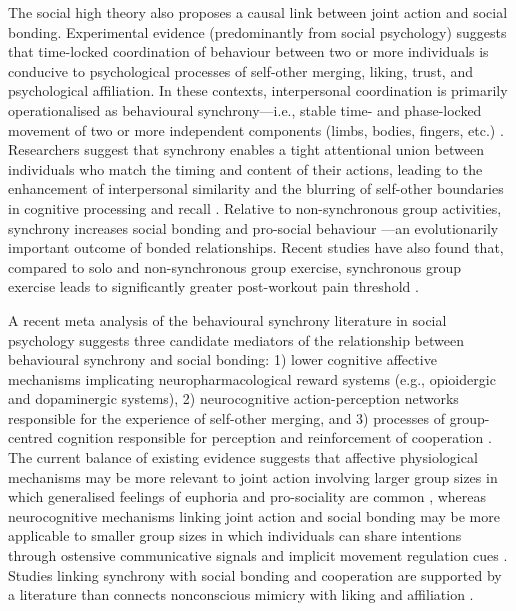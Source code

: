 \begin{CJK}{UTF8}{gbsn}
The social high theory also proposes a causal link between joint action and social bonding.  Experimental evidence (predominantly from social psychology) suggests that time-locked coordination of behaviour between two or more individuals is conducive to psychological processes of self-other merging, liking, trust, and psychological affiliation.  In these contexts, interpersonal coordination is primarily operationalised as behavioural synchrony---i.e., stable time- and phase-locked movement of two or more independent components (limbs, bodies, fingers, etc.) \citep{Pikovsky2007}. Researchers suggest that synchrony enables a tight attentional union between individuals who match the timing and content of their actions, leading to the enhancement of interpersonal similarity and the blurring of self-other boundaries in cognitive processing and recall \citep{Cohen2017}.  Relative to non-synchronous group activities, synchrony increases social bonding and pro-social behaviour \citep{Reddish2013,Reddish2013a,Wiltermuth2009,Tarr2014}---an evolutionarily important outcome of bonded relationships.  Recent studies have also found that, compared to solo and non-synchronous group exercise, synchronous group exercise leads to significantly greater post-workout pain threshold \citep{Cohen2009,Sullivan2014,Sullivan2013a, Sullivan2013b}.

A recent meta analysis of the behavioural synchrony literature in social psychology suggests three candidate mediators of the relationship between behavioural synchrony and social bonding: 1) lower cognitive affective mechanisms implicating neuropharmacological reward systems (e.g., opioidergic and dopaminergic systems), 2) neurocognitive action-perception networks responsible for the experience of self-other merging, and 3) processes of group-centred cognition responsible for perception and reinforcement of cooperation \citep{Mogan2017}.  The current balance of existing evidence suggests that affective physiological mechanisms may be more relevant to joint action involving larger group sizes in which generalised feelings of euphoria and pro-sociality are common \citep[e.g., mass religious rituals or music festivals, see][]{Weinstein2016}, whereas neurocognitive mechanisms linking joint action and social bonding may be more applicable to smaller group sizes in which individuals can share intentions through ostensive communicative signals and implicit movement regulation cues \citep{Lang2017}.  Studies linking synchrony with social bonding and cooperation are supported by a literature than connects nonconscious mimicry with liking and affiliation \citep{VanBaaren2009}.


\end{CJK}
